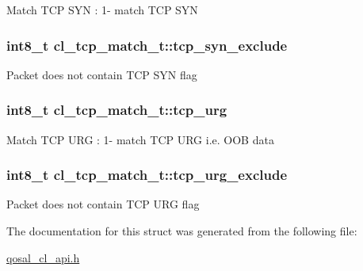 Match T\-C\-P S\-Y\-N \-: 1-\/ match T\-C\-P S\-Y\-N \hypertarget{structcl__tcp__match__t_ae799dfae675d3c763eeead36f7215cf4}{
\subsubsection[{tcp\-\_\-syn\-\_\-exclude}]{\setlength{\rightskip}{0pt plus 5cm}int8\-\_\-t cl\-\_\-tcp\-\_\-match\-\_\-t\-::tcp\-\_\-syn\-\_\-exclude}}\label{structcl__tcp__match__t_ae799dfae675d3c763eeead36f7215cf4}
Packet does not contain T\-C\-P S\-Y\-N flag \hypertarget{structcl__tcp__match__t_a9c84cc54073afb4eafad6c8ff7ede7d4}{
\subsubsection[{tcp\-\_\-urg}]{\setlength{\rightskip}{0pt plus 5cm}int8\-\_\-t cl\-\_\-tcp\-\_\-match\-\_\-t\-::tcp\-\_\-urg}}\label{structcl__tcp__match__t_a9c84cc54073afb4eafad6c8ff7ede7d4}
Match T\-C\-P U\-R\-G \-: 1-\/ match T\-C\-P U\-R\-G i.\-e. O\-O\-B data \hypertarget{structcl__tcp__match__t_aea720fc510ee2144778ae66e34f8e3be}{
\subsubsection[{tcp\-\_\-urg\-\_\-exclude}]{\setlength{\rightskip}{0pt plus 5cm}int8\-\_\-t cl\-\_\-tcp\-\_\-match\-\_\-t\-::tcp\-\_\-urg\-\_\-exclude}}\label{structcl__tcp__match__t_aea720fc510ee2144778ae66e34f8e3be}
Packet does not contain T\-C\-P U\-R\-G flag 

The documentation for this struct was generated from the following file\-:\begin{DoxyCompactItemize}
\item 
\hyperlink{qosal__cl__api_8h}{qosal\-\_\-cl\-\_\-api.\-h}\end{DoxyCompactItemize}
